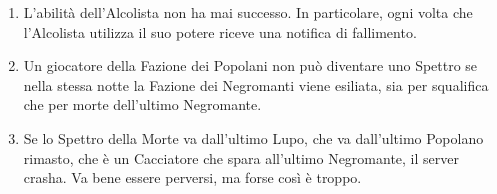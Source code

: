 \documentclass[a4paper,10pt]{article}
\begin{document}
\begin{enumerate}
	\item L'abilità dell'Alcolista non ha mai successo. In particolare, ogni volta che l'Alcolista utilizza il suo potere riceve una notifica di fallimento.
	
	\item Un giocatore della Fazione dei Popolani non può diventare uno Spettro se nella stessa notte la Fazione dei Negromanti viene esiliata, sia per squalifica che per morte dell'ultimo Negromante.
	
	\item Se lo Spettro della Morte va dall'ultimo Lupo, che va dall'ultimo Popolano rimasto, che è un Cacciatore che spara all'ultimo Negromante, il server crasha. Va bene essere perversi, ma forse così è troppo.
	
	
	

	
%	
	

\end{enumerate}
\end{document}
